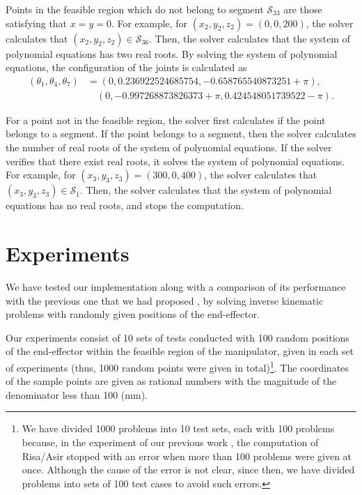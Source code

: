 \documentclass{birkjour}
\theoremstyle{plain}
\theoremstyle{definition}
\begin{document}
    Points in the feasible region which do not belong to segment $\mathcal{S}_{33}$ are
    those satisfying that $x=y=0$. 
    For example, for $(x_2,y_2,z_2)=(0,0,200)$, the solver 
    calculates that $(x_2,y_2,z_2)\in\mathcal{S}_{36}$.
    Then, the solver
    calculates that the system of polynomial equations has two real roots.
    By solving 
    the system of polynomial equations, the configuration of the joints is calculated as
    \begin{align*}
         (\theta_1,\theta_4,\theta_7)
        &=(0,0.236922524685754,-0.658765540873251+\pi),\\
        &\quad (0,-0.997268873826373+\pi,0.424548051739522-\pi).    
    \end{align*}

    For a point not in the feasible region, the solver first calculates if the point 
    belongs to a segment. If the point belongs to a segment, then the solver calculates 
    the number of real roots of the system of polynomial equations. If 
    the solver verifies that there exist real roots, it solves the system of polynomial equations.
    For example, for $(x_3,y_3,z_3)=(300,0,400)$, the solver 
    calculates that $(x_3,y_3,z_3)\in\mathcal{S}_{1}$.
    Then, the solver
    calculates that the system of polynomial equations has no real roots, and stops the computation.

    \section{Experiments}
    \label{sec:exp}

    We have tested our implementation along with a comparison of its performance
    with the previous one that we had proposed \cite{hor-ter-mik2020}, by solving inverse kinematic 
    problems with randomly given positions of the end-effector.

    Our experiments consist of 10 sets of tests conducted with 100 random positions 
    of the end-effector within the feasible region of the manipulator, given in 
    each set of experiments (thus, 1000 random points were given in total)\footnote{We have
    divided 1000 problems into 10 test sets, each with 100 problems because, in the 
    experiment of our previous work \cite{hor-ter-mik2020}, the computation of Risa/Asir
    stopped with an error when more than 100 problems were given at once.
    Although the cause of the error is not clear, since then, 
    we have divided problems into sets of 100 test cases to avoid such errors.}.
    The coordinates of the sample points are given as rational numbers with the magnitude of the denominator less than 100 (mm).
    
\end{document}
